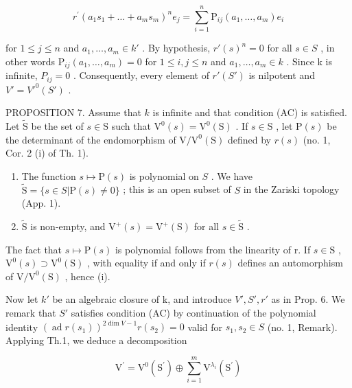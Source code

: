 \[
r ^ {\prime} (a _ {1} s _ {1} + \dots + a _ {m} s _ {m}) ^ {n} e _ {j} = \sum_ {i = 1} ^ {n} \mathrm{P} _ {i j} (a _ {1}, \ldots , a _ {m}) e _ {i}
\]

for \(1 \leq j \leq n\) and \(a_{1}, \ldots, a_{m} \in k'\) . By hypothesis, \(r'(s)^{n} = 0\) for all \(s \in S\) , in other words \(\mathrm{P}_{ij}(a_{1}, \ldots, a_{m}) = 0\) for \(1 \leq i, j \leq n\) and \(a_{1}, \ldots, a_{m} \in k\) . Since k is infinite, \(P_{ij} = 0\) . Consequently, every element of \(r'(S')\) is nilpotent and \(V' = V'^{0}(S')\) .

PROPOSITION 7. Assume that \(k\) is infinite and that condition (AC) is satisfied. Let \(\tilde{\mathrm{S}}\) be the set of \(s \in \mathrm{S}\) such that \(\mathrm{V}^0(s) = \mathrm{V}^0(\mathrm{S})\) . If \(s \in \mathrm{S}\) , let \(\mathrm{P}(s)\) be the determinant of the endomorphism of \(\mathrm{V} / \mathrm{V}^0(\mathrm{S})\) defined by \(r(s)\) (no. 1, Cor. 2 (i) of Th. 1).

\begin{enumerate}
\def\labelenumi{(\roman{enumi})}
\item
  The function \(s \mapsto \mathrm{P}(s)\) is polynomial on \(S\) . We have \(\tilde{\mathrm{S}} = \{s \in S | \mathrm{P}(s) \neq 0\}\) ; this is an open subset of \(S\) in the Zariski topology (App. 1).
\item
  \(\tilde{\mathrm{S}}\) is non-empty, and \(\mathrm{V}^{+}(s) = \mathrm{V}^{+}(\mathrm{S})\) for all \(s\in \tilde{\mathrm{S}}\) .
\end{enumerate}

The fact that \(s \mapsto \mathrm{P}(s)\) is polynomial follows from the linearity of r. If \(s \in \mathrm{S}\) , \(\mathrm{V}^{0}(s) \supset \mathrm{V}^{0}(\mathrm{S})\) , with equality if and only if \(r(s)\) defines an automorphism of \(\mathrm{V}/\mathrm{V}^{0}(\mathrm{S})\) , hence (i).

Now let \(k'\) be an algebraic closure of k, and introduce \(V', S', r'\) as in Prop. 6. We remark that \(S'\) satisfies condition (AC) by continuation of the polynomial identity \((\operatorname{ad} r(s_1))^{2\dim V-1}r(s_2) = 0\) valid for \(s_1, s_2 \in S\) (no. 1, Remark). Applying Th.1, we deduce a decomposition

\[
\mathrm{V} ^ {\prime} = \mathrm{V} ^ {0} (\mathrm{S} ^ {\prime}) \oplus \sum_ {i = 1} ^ {m} \mathrm{V} ^ {\lambda_ {i}} (\mathrm{S} ^ {\prime})
\]


